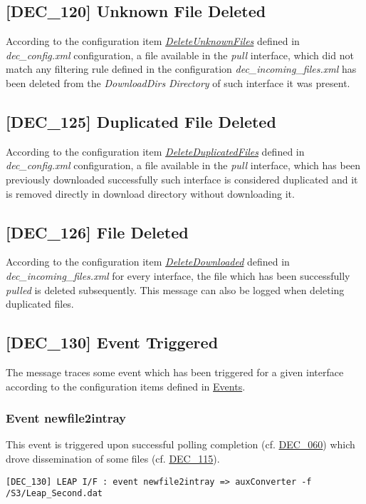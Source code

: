 \documentclass[dec_sum_main.tex]{subfiles}
\begin{document}
\subsection{[DEC\_120] Unknown File Deleted}
According to the configuration item \hyperref[DeleteUnknownFiles]{\textit{DeleteUnknownFiles}} defined in \textit{dec\_config.xml} configuration, a file available in the \textit{pull} interface, which did not match any filtering rule defined in the configuration \textit{dec\_incoming\_files.xml} has been deleted from the \textit{DownloadDirs} \textit{Directory} of such interface it was present.

\label{DEC125}
\subsection{[DEC\_125] Duplicated File Deleted}
According to the configuration item \hyperref[DeleteDuplicatedFiles]{\textit{DeleteDuplicatedFiles}} defined in \textit{dec\_config.xml} configuration, a file available in the \textit{pull} interface, which has been previously downloaded successfully such interface is considered duplicated and it is removed directly in download directory without downloading it.

\label{DEC126}
\subsection{[DEC\_126] File Deleted}
According to the configuration item \hyperref[DeleteFlag]{\textit{DeleteDownloaded}} defined in \textit{dec\_incoming\_files.xml} for every interface, the file which has been successfully \textit{pulled} is deleted subsequently.
This message can also be logged when deleting duplicated files.

\subsection{[DEC\_130] Event Triggered}
The message traces some event which has been triggered for a given interface according to the configuration items defined in \hyperref[Events]{Events}.

\subsubsection{Event newfile2intray}
This event is triggered upon successful polling completion (cf. \hyperref[DEC060]{DEC\_060}) which drove dissemination of some files (cf. \hyperref[DEC115]{DEC\_115}).
\begin{verbatim}
[DEC_130] LEAP I/F : event newfile2intray => auxConverter -f /S3/Leap_Second.dat
\end{verbatim}
\end{document}
